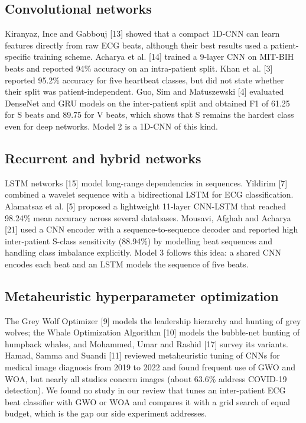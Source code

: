 \documentclass[11pt,a4paper]{article}
\begin{document}
\subsection{Convolutional networks}
Kiranyaz, Ince and Gabbouj [13] showed that a compact 1D-CNN can learn features directly from raw ECG beats, although their best results used a patient-specific training scheme. Acharya et al. [14] trained a 9-layer CNN on MIT-BIH beats and reported 94\% accuracy on an intra-patient split. Khan et al. [3] reported 95.2\% accuracy for five heartbeat classes, but did not state whether their split was patient-independent. Guo, Sim and Matuszewski [4] evaluated DenseNet and GRU models on the inter-patient split and obtained F1 of 61.25 for S beats and 89.75 for V beats, which shows that S remains the hardest class even for deep networks. Model 2 is a 1D-CNN of this kind.

\subsection{Recurrent and hybrid networks}
LSTM networks [15] model long-range dependencies in sequences. Yildirim [7] combined a wavelet sequence with a bidirectional LSTM for ECG classification. Alamatsaz et al. [5] proposed a lightweight 11-layer CNN-LSTM that reached 98.24\% mean accuracy across several databases. Mousavi, Afghah and Acharya [21] used a CNN encoder with a sequence-to-sequence decoder and reported high inter-patient S-class sensitivity (88.94\%) by modelling beat sequences and handling class imbalance explicitly. Model 3 follows this idea: a shared CNN encodes each beat and an LSTM models the sequence of five beats.

\subsection{Metaheuristic hyperparameter optimization}
The Grey Wolf Optimizer [9] models the leadership hierarchy and hunting of grey wolves; the Whale Optimization Algorithm [10] models the bubble-net hunting of humpback whales, and Mohammed, Umar and Rashid [17] survey its variants. Hamad, Samma and Suandi [11] reviewed metaheuristic tuning of CNNs for medical image diagnosis from 2019 to 2022 and found frequent use of GWO and WOA, but nearly all studies concern images (about 63.6\% address COVID-19 detection). We found no study in our review that tunes an inter-patient ECG beat classifier with GWO or WOA and compares it with a grid search of equal budget, which is the gap our side experiment addresses.
\end{document}
